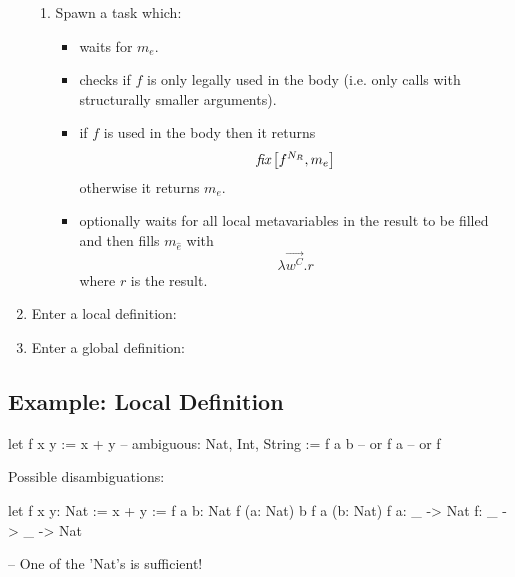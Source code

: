 \begin{enumerate}
\begin{enumerate}
            \item Spawn a task which:
                \begin{itemize}
                    \item waits for $m_e$.

                    \item checks if $f$ is only legally used in the body (i.e.
                        only calls with structurally smaller arguments).

                    \item if $f$ is used in the body then it returns
                        $$
                            {{\text{\it fix}} \left[ {f^{N_R}, m_e} \right]}
                        $$
                        otherwise it returns $m_e$.

                    \item optionally waits for all local
                        metavariables in the result to be filled and then fills
                        $m_{\hat e}$ with
                        $$
                            \lambda \vec {w^C}. r
                        $$
                        where $r$ is the result.
                \end{itemize}
        \end{enumerate}


    \item Enter a local definition:


    \item Enter a global definition:


\end{enumerate}








\subsection{Example: Local Definition}

\begin{alba}
    let
        f x y := x + y      -- ambiguous: Nat, Int, String
    :=
        f a b
        -- or
        f a
        -- or
        f
\end{alba}

Possible disambiguations:
\begin{alba}
    let
        f x y: Nat := x + y
    :=
        f a b: Nat
        f (a: Nat) b
        f a (b: Nat)
        f a: _ -> Nat
        f: _ -> _ -> Nat

    -- One of the 'Nat's is sufficient!
\end{alba}

